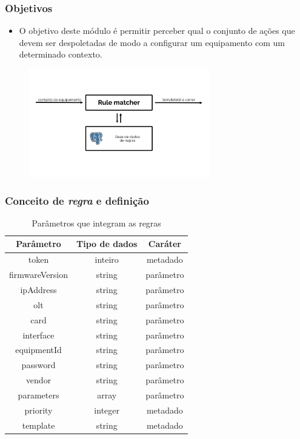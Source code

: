 \begin{frame}
    \frametitle{Objetivos}
    \begin{itemize}
        \item O objetivo deste módulo é permitir perceber qual o conjunto de
        ações que devem ser despoletadas de modo a configurar um equipamento com
        um determinado contexto.
    \end{itemize}    
    \begin{figure}
        \includegraphics[width=0.7\textwidth]{./assets/rule_matcher/rule_matcher.png}
    \end{figure}
\end{frame}

\begin{frame}
    \frametitle{Conceito de \textit{regra} e definição}
    \begin{table}
        \centering
        \begin{tabular}{ |c|c|c| }
          \hline
          \textbf{Parâmetro} & \textbf{Tipo de dados} & \textbf{Caráter} \\ \hline
          token & inteiro & metadado \\ \hline
          firmwareVersion & string & parâmetro \\ \hline
          ipAddress & string & parâmetro \\ \hline
          olt & string & parâmetro \\ \hline
          card & string & parâmetro \\ \hline
          interface & string & parâmetro \\ \hline
          equipmentId & string & parâmetro \\ \hline
          password & string & parâmetro \\ \hline
          vendor & string & parâmetro \\ \hline
          parameters & array & parâmetro \\ \hline
          priority & integer & metadado \\ \hline
          template & string & metadado \\ \hline
        \end{tabular}
        \caption{Parâmetros que integram as regras}
      \end{table}
\end{frame}
